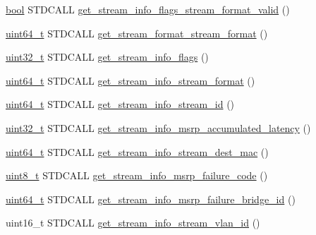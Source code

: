 \begin{DoxyCompactItemize}
\hyperlink{avb__gptp_8h_af6a258d8f3ee5206d682d799316314b1}{bool} S\+T\+D\+C\+A\+LL \hyperlink{classavdecc__lib_1_1stream__output__get__stream__info__response__imp_a4dd38450eed843b0f5f8e75267b18a0e}{get\+\_\+stream\+\_\+info\+\_\+flags\+\_\+stream\+\_\+format\+\_\+valid} ()
\item 
\hyperlink{parse_8c_aec6fcb673ff035718c238c8c9d544c47}{uint64\+\_\+t} S\+T\+D\+C\+A\+LL \hyperlink{classavdecc__lib_1_1stream__output__get__stream__info__response__imp_af415b0e7866128fa11fce7cdcd089a1b}{get\+\_\+stream\+\_\+format\+\_\+stream\+\_\+format} ()
\item 
\hyperlink{parse_8c_a6eb1e68cc391dd753bc8ce896dbb8315}{uint32\+\_\+t} S\+T\+D\+C\+A\+LL \hyperlink{classavdecc__lib_1_1stream__output__get__stream__info__response__imp_a7694ef99f2af4fac732fa2a5128a862d}{get\+\_\+stream\+\_\+info\+\_\+flags} ()
\item 
\hyperlink{parse_8c_aec6fcb673ff035718c238c8c9d544c47}{uint64\+\_\+t} S\+T\+D\+C\+A\+LL \hyperlink{classavdecc__lib_1_1stream__output__get__stream__info__response__imp_a63f777324963f5104c6a788b5d5e2de3}{get\+\_\+stream\+\_\+info\+\_\+stream\+\_\+format} ()
\item 
\hyperlink{parse_8c_aec6fcb673ff035718c238c8c9d544c47}{uint64\+\_\+t} S\+T\+D\+C\+A\+LL \hyperlink{classavdecc__lib_1_1stream__output__get__stream__info__response__imp_af3936cefa1b1b6de8c200f2cb0d0ff32}{get\+\_\+stream\+\_\+info\+\_\+stream\+\_\+id} ()
\item 
\hyperlink{parse_8c_a6eb1e68cc391dd753bc8ce896dbb8315}{uint32\+\_\+t} S\+T\+D\+C\+A\+LL \hyperlink{classavdecc__lib_1_1stream__output__get__stream__info__response__imp_a28cc44ebba58da58b64ee18da7b0af8e}{get\+\_\+stream\+\_\+info\+\_\+msrp\+\_\+accumulated\+\_\+latency} ()
\item 
\hyperlink{parse_8c_aec6fcb673ff035718c238c8c9d544c47}{uint64\+\_\+t} S\+T\+D\+C\+A\+LL \hyperlink{classavdecc__lib_1_1stream__output__get__stream__info__response__imp_a09bd990c165cf70227fec1cc3efe0c1b}{get\+\_\+stream\+\_\+info\+\_\+stream\+\_\+dest\+\_\+mac} ()
\item 
\hyperlink{stdint_8h_aba7bc1797add20fe3efdf37ced1182c5}{uint8\+\_\+t} S\+T\+D\+C\+A\+LL \hyperlink{classavdecc__lib_1_1stream__output__get__stream__info__response__imp_ae1309302604fdeaf7482693e3787c4f7}{get\+\_\+stream\+\_\+info\+\_\+msrp\+\_\+failure\+\_\+code} ()
\item 
\hyperlink{parse_8c_aec6fcb673ff035718c238c8c9d544c47}{uint64\+\_\+t} S\+T\+D\+C\+A\+LL \hyperlink{classavdecc__lib_1_1stream__output__get__stream__info__response__imp_a4270084121240db1d8980249568141df}{get\+\_\+stream\+\_\+info\+\_\+msrp\+\_\+failure\+\_\+bridge\+\_\+id} ()
\item 
uint16\+\_\+t S\+T\+D\+C\+A\+LL \hyperlink{classavdecc__lib_1_1stream__output__get__stream__info__response__imp_a6567d72273a49538487b286ad2e47c2a}{get\+\_\+stream\+\_\+info\+\_\+stream\+\_\+vlan\+\_\+id} ()
\end{DoxyCompactItemize}
